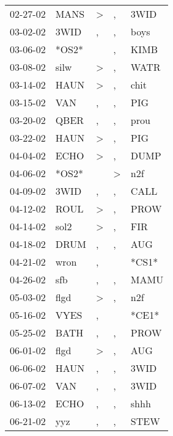 \begin{supertabular}{lllll}
 02-27-02 &   MANS &     \textgreater &                , &   3WID \\
 03-02-02 &   3WID &                , &                , &   boys \\
 03-06-02 &  *OS2* &                  &                , &   KIMB \\
 03-08-02 &   silw &     \textgreater &                , &   WATR \\
 03-14-02 &   HAUN &     \textgreater &                , &   chit \\
 03-15-02 &    VAN &                , &                , &    PIG \\
 03-20-02 &   QBER &                , &                , &   prou \\
 03-22-02 &   HAUN &     \textgreater &                , &    PIG \\
 04-04-02 &   ECHO &     \textgreater &                , &   DUMP \\
 04-06-02 &  *OS2* &                  &     \textgreater &    n2f \\
 04-09-02 &   3WID &                , &                , &   CALL \\
 04-12-02 &   ROUL &     \textgreater &                , &   PROW \\
 04-14-02 &   sol2 &     \textgreater &                , &    FIR \\
 04-18-02 &   DRUM &                , &                , &    AUG \\
 04-21-02 &   wron &                , &                  &  *CS1* \\
 04-26-02 &    sfb &                , &                , &   MAMU \\
 05-03-02 &   flgd &     \textgreater &                , &    n2f \\
 05-16-02 &   VYES &                , &                  &  *CE1* \\
 05-25-02 &   BATH &                , &                , &   PROW \\
 06-01-02 &   flgd &     \textgreater &                , &    AUG \\
 06-06-02 &   HAUN &                , &                , &   3WID \\
 06-07-02 &    VAN &                , &                , &   3WID \\
 06-13-02 &   ECHO &                , &                , &   shhh \\
 06-21-02 &    yyz &                , &                , &   STEW \\

\end{supertabular}
